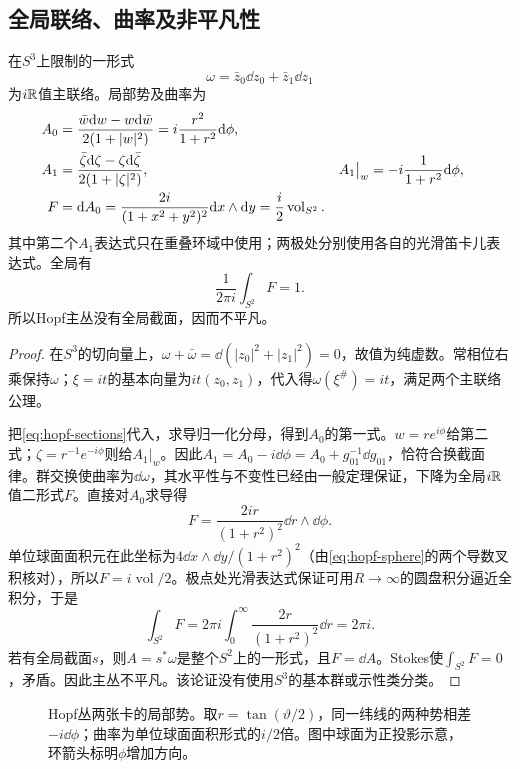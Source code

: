\subsection{全局联络、曲率及非平凡性}
\begin{theorem}\label{thm:hopf-connection}
在$S^3$上限制的一形式
\[
 \omega=\bar z_0\dd z_0+\bar z_1\dd z_1
\]
为$i\mathbb{R}$值主联络。局部势及曲率为
\begin{align}
 A_0&=\frac{\bar w\mathrm{d} w-w\mathrm{d}\bar w}{2(1+|w|^2)}
     =i\frac{r^2}{1+r^2}\mathrm{d}\phi,\label{eq:hopf-potentials}\\
 A_1&=\frac{\bar\zeta\mathrm{d}\zeta-\zeta\mathrm{d}\bar\zeta}{2(1+|\zeta|^2)},
 & A_1\big|_w&=-i\frac1{1+r^2}\mathrm{d}\phi,\notag\\
 F&=\mathrm{d} A_0=\frac{2i}{(1+x^2+y^2)^2}\mathrm{d} x\wedge\mathrm{d} y
   =\frac i2\operatorname{vol}_{S^2}.\label{eq:hopf-curvature}
\end{align}
其中第二个$A_1$表达式只在重叠环域中使用；两极处分别使用各自的光滑笛卡儿表达式。全局有
\begin{equation}\label{eq:hopf-flux}
 \frac1{2\pi i}\int_{S^2}F=1.
\end{equation}
所以Hopf主丛没有全局截面，因而不平凡。
\end{theorem}
\begin{proof}
在$S^3$的切向量上，$\omega+\bar\omega=\dd(|z_0|^2+|z_1|^2)=0$，故值为纯虚数。常相位右乘保持$\omega$；$\xi=it$的基本向量为$it(z_0,z_1)$，代入得$\omega(\xi^\#)=it$，满足两个主联络公理。

把\eqref{eq:hopf-sections}代入，求导归一化分母，得到$A_0$的第一式。$w=re^{i\phi}$给第二式；$\zeta=r^{-1}e^{-i\phi}$则给$A_1|_w$。因此$A_1=A_0-i\dd\phi=A_0+g_{01}^{-1}\dd g_{01}$，恰符合换截面律。群交换使曲率为$\dd\omega$，其水平性与不变性已经由一般定理保证，下降为全局$i\mathbb{R}$值二形式$F$。直接对$A_0$求导得
\[
 F=\frac{2ir}{(1+r^2)^2}\dd r\wedge\dd\phi.
\]
单位球面面积元在此坐标为$4\dd x\wedge\dd y/(1+r^2)^2$（由\eqref{eq:hopf-sphere}的两个导数叉积核对），所以$F=i\operatorname{vol}/2$。极点处光滑表达式保证可用$R\to\infty$的圆盘积分逼近全积分，于是
\[
 \int_{S^2}F=2\pi i\int_0^\infty\frac{2r}{(1+r^2)^2}\dd r=2\pi i.
\]
若有全局截面$s$，则$A=s^*\omega$是整个$S^2$上的一形式，且$F=\dd A$。Stokes使$\int_{S^2}F=0$，矛盾。因此主丛不平凡。该论证没有使用$S^3$的基本群或示性类分类。
\end{proof}

\begin{figure}[htbp]
\centering
\caption{Hopf丛两张卡的局部势。取$r=\tan(\vartheta/2)$，同一纬线的两种势相差$-i\dd\phi$；曲率为单位球面面积形式的$i/2$倍。图中球面为正投影示意，环箭头标明$\phi$增加方向。}
\label{fig:hopf-potentials}
\end{figure}

